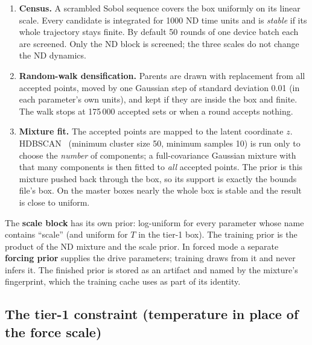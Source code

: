 \documentclass[10pt,a4paper]{article}
\begin{document}
\begin{enumerate}
  \item \textbf{Census.} A scrambled Sobol sequence covers the box uniformly on its linear scale. Every candidate is
        integrated for 1000 ND time units and is \emph{stable} if its whole trajectory stays finite. By default 50
        rounds of one device batch each are screened. Only the ND block is screened; the three scales do not
        change the ND dynamics.
  \item \textbf{Random-walk densification.} Parents are drawn with replacement from all accepted points, moved by one
        Gaussian step of standard deviation 0.01 (in each parameter's own units), and kept if they are inside the
        box and finite. The walk stops at 175\,000 accepted sets or when a round accepts nothing.
  \item \textbf{Mixture fit.} The accepted points are mapped to the latent coordinate $z$. HDBSCAN~\cite{campello2013} (minimum cluster
        size 50, minimum samples 10) is run only to choose the \emph{number} of components; a full-covariance
        Gaussian mixture with that many components is then fitted to \emph{all} accepted points. The prior is this
        mixture pushed back through the box, so its support is exactly the bounds file's box. On the master boxes
        nearly the whole box is stable and the result is close to uniform.
\end{enumerate}

The \textbf{scale block} has its own prior: log-uniform for every parameter whose name contains ``scale'' (and
uniform for $T$ in the tier-1 box). The training prior is the product of the ND mixture and the scale prior. In
forced mode a separate \textbf{forcing prior} supplies the drive parameters; training draws from it and never
infers it. The finished prior is stored as an artifact and named by the mixture's fingerprint, which the training
cache uses as part of its identity.

\subsection{The tier-1 constraint (temperature in place of the force scale)}
\label{sec:tier1}
\end{document}
